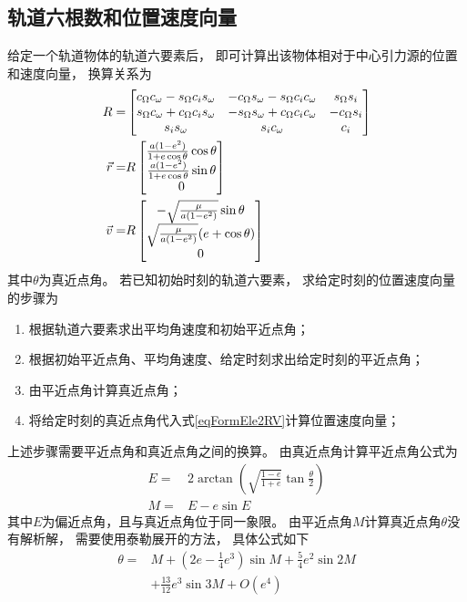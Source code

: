 \subsection{轨道六根数和位置速度向量}
给定一个轨道物体的轨道六要素后，
即可计算出该物体相对于中心引力源的位置和速度向量，
换算关系为
\begin{align}
    R =& \left[\begin{matrix}
        c_\Omega c_\omega-s_\Omega c_i s_\omega & -c_\Omega s_\omega-s_\Omega c_i c_\omega & s_\Omega s_i \\
        s_\Omega c_\omega+c_\Omega c_i s_\omega & -s_\Omega s_\omega+c_\Omega c_i c_\omega & -c_\Omega s_i \\
        s_i s_\omega & s_i c_\omega & c_i
    \end{matrix}\right] \notag\\
    \vec{r} =& R\left[\begin{matrix}
        \frac{a(1-e^2)}{1+e\cos\theta}\cos\theta \\ \frac{a(1-e^2)}{1+e\cos\theta}\sin\theta \\ 0
    \end{matrix}\right] \notag\\
    \vec{v} =& R\left[\begin{matrix}
        -\sqrt{\frac{\mu}{a(1-e^2)}}\sin\theta \\ \sqrt{\frac{\mu}{a(1-e^2)}}(e+\cos\theta) \\ 0
    \end{matrix}\right] \label{eqFormEle2RV}
\end{align}
其中$\theta$为真近点角。
若已知初始时刻的轨道六要素，
求给定时刻的位置速度向量的步骤为
\begin{enumerate}[label={(\arabic*)}]\setlength{\itemsep}{-5pt}
    \item 根据轨道六要素求出平均角速度和初始平近点角；
    \item 根据初始平近点角、平均角速度、给定时刻求出给定时刻的平近点角；
    \item 由平近点角计算真近点角；
    \item 将给定时刻的真近点角代入式\eqref{eqFormEle2RV}计算位置速度向量；
\end{enumerate}
上述步骤需要平近点角和真近点角之间的换算。
由真近点角计算平近点角公式为
\begin{align*}
    E =& 2\arctan\left(\sqrt{\frac{1-e}{1+e}}\tan\frac{\theta}{2}\right) \\
    M =& E - e\sin{E}
\end{align*}
其中$E$为偏近点角，且与真近点角位于同一象限。
由平近点角$M$计算真近点角$\theta$没有解析解，
需要使用泰勒展开的方法，
具体公式如下\cite{msmart1977}
\begin{align*}
    \theta =& M+\left(2e-\frac{1}{4}e^3\right)\sin{M}
    + {\frac{5}{4}}e^2\sin{2M} \\
    &+ {\frac{13}{12}}e^3\sin{3M}+O(e^4)
\end{align*}

